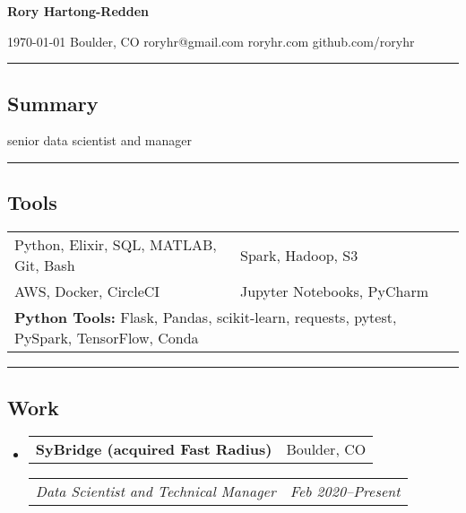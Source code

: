\documentclass[10pt,letterpaper]{article}
\makeatletter
\newenvironment{indentsection}[1]
{\begin{list}{}%
	{\setlength{\leftmargin}{#1}}
	\item[]%
}
{\end{list}}
\newcommand{\headerrow}[2]{
\begin{tabular*}{\linewidth}{l@{\extracolsep{\fill}}r}
		#1 &
		#2 \\
	\end{tabular*}
}
\newcommand{\jobitem}[4]{\item \headerrow{\textbf{#1}}{#2}
\headerrow{\emph{#3}}{\emph{#4}}}
\makeatother
\begin{document}
{\raggedright \LARGE \bf Rory Hartong-Redden}

{\raggedleft 
\today \/ \textbar
\/ Boulder, CO \textbar
\/ roryhr@gmail.com \textbar
\/ roryhr.com \textbar\/   
github.com/roryhr\\
}
\hrule

\subsection*{Summary}
\begin{centering}  
senior data scientist and manager\\  
\end{centering}
\hrule

\subsection*{Tools}
\begin{indentsection}{\parindent}
\begin{tabular}{p{0.5\linewidth}   p{0.5\linewidth}} 
	Python, Elixir, SQL, MATLAB, Git, Bash
	& Spark, Hadoop, S3 \\

	AWS, Docker, CircleCI 
	& Jupyter Notebooks, PyCharm\\ 
	
	\multicolumn{2}{l}{
		\textbf{Python Tools:} Flask, Pandas, scikit-learn, requests, pytest, PySpark, TensorFlow, Conda
		}
\end{tabular}
\end{indentsection}

\hrule
\subsection*{Work}

\begin{itemize}
	\jobitem{SyBridge (acquired Fast Radius)}{Boulder, CO}
		     {Data Scientist and Technical Manager}{Feb 2020--Present}
\end{itemize}
\end{document}
